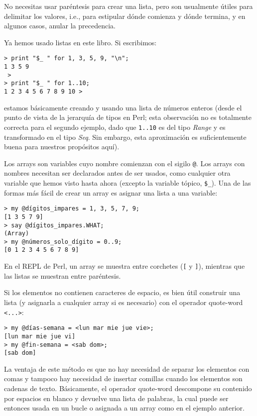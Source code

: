 No necesitas usar paréntesis para crear una lista,
pero son usualmente útiles para delimitar los valores,
i.e., para estipular dónde comienza y dónde termina, y
en algunos casos, anular la precedencia.

Ya hemos usado listas en este libro. Si escribimos:

\begin{lstlisting}
> print "$_ " for 1, 3, 5, 9, "\n";
1 3 5 9
 >
> print "$_ " for 1..10;
1 2 3 4 5 6 7 8 9 10 >
\end{lstlisting}

estamos básicamente creando y usando una lista de números
enteros (desde el punto de vista de la jerarquía de tipos en
Perl; esta observación no es totalmente correcta para el segundo
ejemplo, dado que \verb|1..10| es del tipo \emph{Range} y
es transformado en el tipo \emph{Seq}. Sin embargo, esta 
aproximación es suficientemente buena para nuestros 
propósitos aquí).

Los arrays son variables cuyo nombre comienzan con
el sigilo \verb|@|. Los arrays con nombres necesitan ser declarados
antes de ser usados, como cualquier otra variable que hemos
visto hasta ahora (excepto la variable tópico, \verb|$_|). 
Una de las formas más fácil de crear un array es asignar una
lista a una variable:

\begin{lstlisting}
> my @dígitos_impares = 1, 3, 5, 7, 9;
[1 3 5 7 9]
> say @dígitos_impares.WHAT;
(Array)
> my @números_solo_dígito = 0..9;
[0 1 2 3 4 5 6 7 8 9]
\end{lstlisting}

En el REPL de Perl, un array se muestra entre corchetes
(\verb|[| y \verb|]|), mientras que las listas se muestran
entre paréntesis.

Si los elementos no contienen caracteres de espacio, es bien útil
construir una lista (y asignarla a cualquier array si es necesario)
con el operador quote-word \verb|<...>|:

\begin{lstlisting}
> my @días-semana = <lun mar mie jue vie>;
[lun mar mie jue vi]
> my @fin-semana = <sab dom>;
[sab dom]
\end{lstlisting}

La ventaja de este método es que no hay necesidad de separar los 
elementos con comas y tampoco hay necesidad de insertar comillas
cuando los elementos son cadenas de texto. Básicamente, el operador
quote-word descompone su contenido por espacios en blanco y devuelve
una lista de palabras, la cual puede ser entonces usada en un bucle
o asignada a un array como en el ejemplo anterior.

